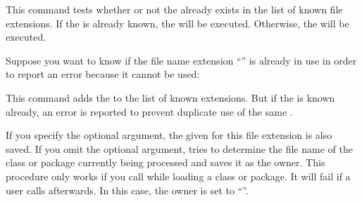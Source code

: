 \begin{Declaration}
\end{Declaration}
This command tests whether or not the
 already exists in the list of known file extensions. If the
 is already known, the  will be
executed. Otherwise, the  will be executed.
\begin{Example}
  Suppose you want to know if the file name extension ``'' is
  already in use in order to report an error because it cannot be used:
\begin{lstcode}
\end{lstcode}
\end{Example}
\EndIndexGroup


\begin{Declaration}
\end{Declaration}
This command adds the  to the list of known extensions. But
if the  is known already, an error is reported to prevent
duplicate use of the same .

If you specify the optional  argument, the given
 for this file extension is also saved. If you omit the optional
argument,  tries to determine the file name of the class or
package currently being processed and saves it as the owner.
This procedure only works if you call
 while loading a class or package. It will fail if a user
calls  afterwards. In this case, the owner is set to
``''.

